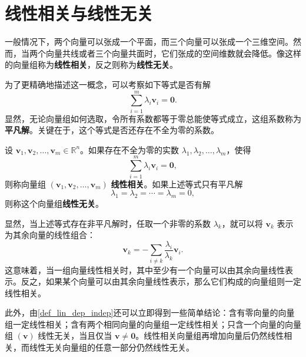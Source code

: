 \section{线性相关与线性无关}
\label{sec_lin_dep_indep}

一般情况下，两个向量可以张成一个平面，而三个向量可以张成一个三维空间。然而，当两个向量共线或者三个向量共面时，它们张成的空间维数就会降低。像这样的向量组称为\textbf{线性相关}，反之则称为\textbf{线性无关}。

为了更精确地描述这一概念，可以考察如下等式是否有解
\[
    \sum_{i=1}^{m}\lambda_i\bm v_i=\bm 0.
\]
显然，无论向量组如何选取，令所有系数都等于零总能使等式成立，这组系数称为\textbf{平凡解}。关键在于，这个等式是否还存在不全为零的系数。

\begin{definition}[线性相关与线性无关]
    \label{def_lin_dep_indep}
    设 \(\bm v_1,\bm v_2,\ldots,\bm v_m\in\mathbb R^n\)。如果存在不全为零的实数 \(\lambda_1,\lambda_2,\ldots,\lambda_m\)，使得
    \[
        \sum_{i=1}^{m}\lambda_i\bm v_i=\bm 0,
    \]
    则称向量组 \((\bm v_1,\bm v_2,\ldots,\bm v_m)\) \textbf{线性相关}。如果上述等式只有平凡解
    \[
        \lambda_1=\lambda_2=\cdots=\lambda_m=0,
    \]
    则称这个向量组\textbf{线性无关}。
\end{definition}

显然，当上述等式存在非平凡解时，任取一个非零的系数 \(\lambda_k\)，就可以将 \(\bm v_k\) 表示为其余向量的线性组合：
\[
    \bm v_k=-\sum_{i\ne k}\frac{\lambda_i}{\lambda_k}\bm v_i.
\]
这意味着，当一组向量线性相关时，其中至少有一个向量可以由其余向量线性表示。反之，如果某个向量可以由其余向量线性表示，那么它们构成的向量组则一定线性相关。

此外，由\cref{def_lin_dep_indep}还可以立即得到一些简单结论：含有零向量的向量组一定线性相关；含有两个相同向量的向量组一定线性相关；只含一个向量的向量组 \((\bm v)\) 线性无关，当且仅当 \(\bm v\ne\bm 0\)。线性相关向量组再增加向量后仍然线性相关，而线性无关向量组的任意一部分仍然线性无关。

